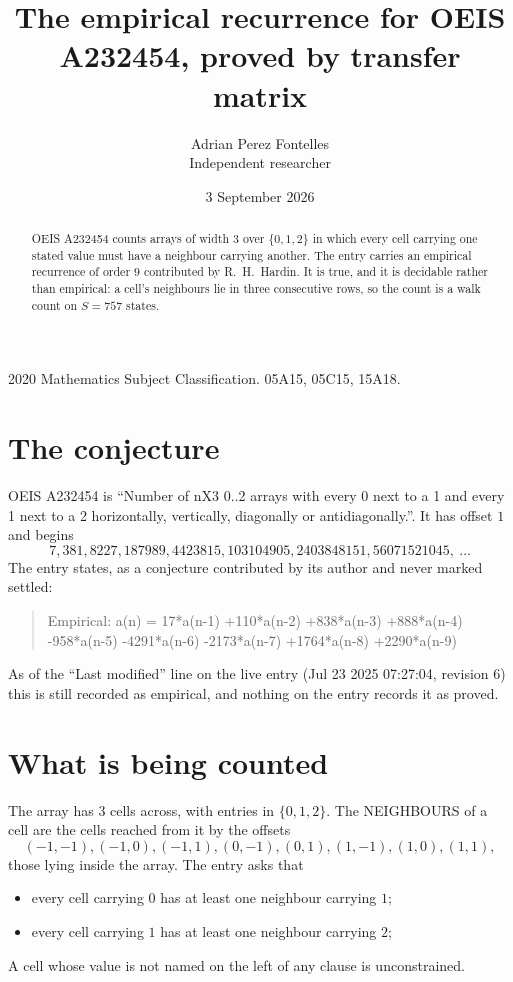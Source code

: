 \documentclass[11pt,a4paper]{article}
\title{The empirical recurrence for OEIS A232454, proved by transfer matrix}
\author{Adrian Perez Fontelles\\ \small Independent researcher}
\date{3 September 2026}
\theoremstyle{plain}
\theoremstyle{definition}
\begin{document}
\maketitle

\begin{abstract}
OEIS A232454 counts arrays of width $3$ over $\{0,1,2\}$ in which every cell carrying one stated
value must have a neighbour carrying another. The entry carries an empirical recurrence of
order $9$ contributed by R.~H.~Hardin. It is true, and it is decidable rather than
empirical: a cell's neighbours lie in three consecutive rows, so the count is a walk count on
$S=757$ states.
\end{abstract}

\noindent\small 2020 Mathematics Subject Classification. 05A15, 05C15, 15A18.\normalsize

\section{The conjecture}

OEIS A232454 is ``Number of nX3 0..2 arrays with every 0 next to a 1 and every 1 next to a 2 horizontally, vertically, diagonally or antidiagonally.''. It has offset $1$ and begins
\[
7, 381, 8227, 187989, 4423815, 103104905, 2403848151, 56071521045,\ \dots
\]
The entry states, as a conjecture contributed by its author and never marked settled:
\begin{quote}
Empirical: a(n) = 17*a(n-1) +110*a(n-2) +838*a(n-3) +888*a(n-4) -958*a(n-5) -4291*a(n-6) -2173*a(n-7) +1764*a(n-8) +2290*a(n-9)
\end{quote}
As of the ``Last modified'' line on the live entry (Jul 23 2025 07:27:04, revision 6) this is still
recorded as empirical, and nothing on the entry records it as proved.

\section{What is being counted}

The array has $3$ cells across, with entries in $\{0,1,2\}$. The NEIGHBOURS of a cell are the
cells reached from it by the offsets
\[
(-1,-1), (-1,0), (-1,1), (0,-1), (0,1), (1,-1), (1,0), (1,1),
\]
those lying inside the array. The entry asks that
\begin{itemize}
\item every cell carrying $0$ has at least one neighbour carrying $1$;
\item every cell carrying $1$ has at least one neighbour carrying $2$;

\end{itemize}
A cell whose value is not named on the left of any clause is unconstrained.
\end{document}
